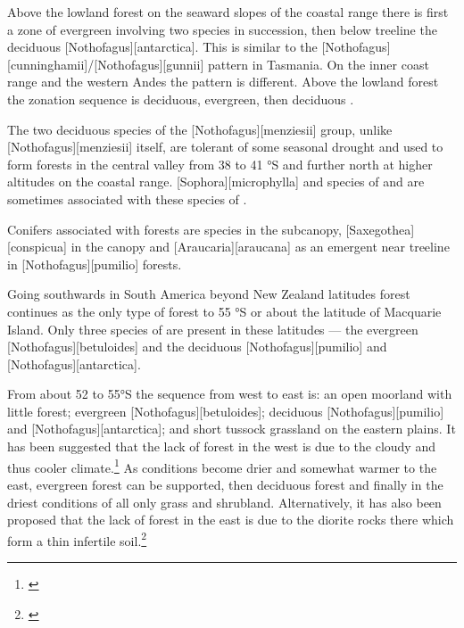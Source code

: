 Above the lowland forest on the seaward slopes of the coastal range there is first a zone of evergreen  involving two species in succession, then below treeline the deciduous [Nothofagus][antarctica].
This is similar to the [Nothofagus][cunninghamii]/[Nothofagus][gunnii] pattern in Tasmania.
On the inner coast range and the western Andes the pattern is different.
Above the lowland forest the zonation sequence is deciduous, evergreen, then deciduous .

The two deciduous species of the [Nothofagus][menziesii] group, unlike [Nothofagus][menziesii] itself, are tolerant of some seasonal drought and used to form forests in the central valley from 38 to 41 °S and further north at higher altitudes on the coastal range. [Sophora][microphylla] and species of  and  are sometimes associated with these species of .

Conifers associated with  forests are  species in the subcanopy, [Saxegothea][conspicua] in the canopy and [Araucaria][araucana] as an emergent near treeline in [Nothofagus][pumilio] forests.

Going southwards in South America beyond New Zealand latitudes  forest continues as the only type of forest to 55 °S or about the latitude of Macquarie Island.
Only three species of  are present in these latitudes --- the evergreen [Nothofagus][betuloides] and the deciduous [Nothofagus][pumilio] and [Nothofagus][antarctica].

From about 52 to 55°S the sequence from west to east is: an open moorland with little forest; evergreen [Nothofagus][betuloides]; deciduous [Nothofagus][pumilio] and [Nothofagus][antarctica]; and short tussock grassland on the eastern plains.
It has been suggested that the lack of forest in the west is due to the cloudy and thus cooler climate.\footnote{\cite{mcqueen1976ecology}}
As conditions become drier and somewhat warmer to the east, evergreen  forest can be supported, then deciduous  forest and finally in the driest conditions of all only grass and shrubland.
Alternatively, it has also been proposed that the lack of forest in the east is due to the diorite rocks there which form a thin infertile soil.\footnote{\cite{godley1960botany}}

